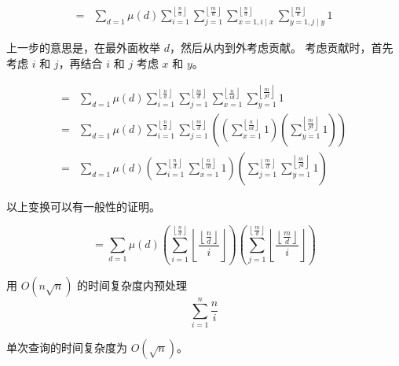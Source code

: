 \documentclass[UTF8]{article}
\newcommand{\floorfrac}[2]{\left\lfloor \frac {#1} {#2} \right\rfloor}
\begin{document}
	\begin{align*}=&
		\sum_{d = 1} \mu(d)
		\sum_{i = 1}^{\floorfrac nd}
		\sum_{j = 1}^{\floorfrac md}
		\sum_{x = 1, i \mid x}^{\floorfrac nd}
		\sum_{y = 1, j \mid y}^{\floorfrac md}
		1
	\end{align*}

	上一步的意思是，在最外面枚举 $d$，然后从内到外考虑贡献。
	考虑贡献时，首先考虑 $i$ 和 $j$，再结合 $i$ 和 $j$ 考虑 $x$ 和 $y$。

	\begin{align*}=&
		\sum_{d = 1} \mu(d)
		\sum_{i = 1}^{\floorfrac nd}
		\sum_{j = 1}^{\floorfrac md}
		\sum_{x = 1}^{\floorfrac n {id}}
		\sum_{y = 1}^{\floorfrac m {jd}}
		1
		\\=&
		\sum_{d = 1} \mu(d)
		\sum_{i = 1}^{\floorfrac nd}
		\sum_{j = 1}^{\floorfrac md}
		\left(
		\left( \sum_{x = 1}^{\floorfrac n {id}} 1 \right)
		\left( \sum_{y = 1}^{\floorfrac m {jd}} 1 \right)
		\right)
		\\=&
		\sum_{d = 1} \mu(d)
		\left(
		\sum_{i = 1}^{\floorfrac nd}
		\sum_{x = 1}^{\floorfrac n {id}} 1
		\right)
		\left(
		\sum_{j = 1}^{\floorfrac md}
		\sum_{y = 1}^{\floorfrac m {jd}} 1
		\right)
	\end{align*}

	以上变换可以有一般性的证明。

	$$
	= \sum_{d = 1} \mu(d)
	\left(
	\sum_{i = 1}^{\floorfrac nd} \floorfrac {\floorfrac n d} i
	\right)
	\left(
	\sum_{j = 1}^{\floorfrac md} \floorfrac {\floorfrac m d} i
	\right)
	$$

	\bigskip
	用 $O(n \sqrt n)$ 的时间复杂度内预处理
	$$
	\sum_{i = 1}^{n} \frac {n} {i}
	$$

	单次查询的时间复杂度为 $O(\sqrt n)$。
\end{document}
